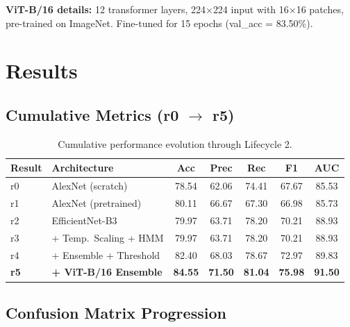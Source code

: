 \documentclass[11pt]{article}
\begin{document}
\noindent \textbf{ViT-B/16 details:} 12 transformer layers, 224$\times$224 input with 16$\times$16 patches, pre-trained on ImageNet. Fine-tuned for 15 epochs (val\_acc = 83.50\%).

\section{Results}

\subsection{Cumulative Metrics (r0 $\to$ r5)}

\begin{table}[H]
    \centering
    \renewcommand{\arraystretch}{1.2}
    \begin{tabular}{llccccc}
        \toprule
        \textbf{Result} & \textbf{Architecture} & \textbf{Acc} & \textbf{Prec} & \textbf{Rec} & \textbf{F1} & \textbf{AUC} \\
        \midrule
        r0 & AlexNet (scratch) & 78.54 & 62.06 & 74.41 & 67.67 & 85.53 \\
        r1 & AlexNet (pretrained) & 80.11 & 66.67 & 67.30 & 66.98 & 85.73 \\
        r2 & EfficientNet-B3 & 79.97 & 63.71 & 78.20 & 70.21 & 88.93 \\
        r3 & + Temp.\ Scaling + HMM & 79.97 & 63.71 & 78.20 & 70.21 & 88.93 \\
        r4 & + Ensemble + Threshold & 82.40 & 68.03 & 78.67 & 72.97 & 89.83 \\
        \rowcolor{bestgreen}
        \textbf{r5} & \textbf{+ ViT-B/16 Ensemble} & \textbf{84.55} & \textbf{71.50} & \textbf{81.04} & \textbf{75.98} & \textbf{91.50} \\
        \bottomrule
    \end{tabular}
    \caption{Cumulative performance evolution through Lifecycle 2.}
\end{table}

\subsection{Confusion Matrix Progression}
\end{document}

